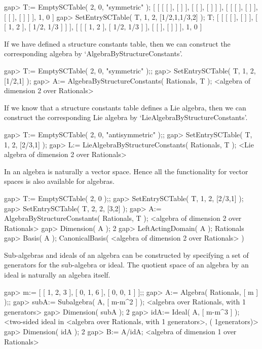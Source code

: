 \beginexample
    gap> T:= EmptySCTable( 2, 0, "symmetric" );
    [ [ [ [  ], [  ] ], [ [  ], [  ] ] ], [ [ [  ], [  ] ], [ [  ], [  ] ] ], 1, 0 ]
    gap> SetEntrySCTable( T, 1, 2, [1/2,1,1/3,2] ); T;
    [ [ [ [  ], [  ] ], [ [ 1, 2 ], [ 1/2, 1/3 ] ] ], 
    [ [ [ 1, 2 ], [ 1/2, 1/3 ] ], [ [  ], [  ] ] ], 1, 0 ]
\endexample

If we have defined a structure constants table, then we can construct
the corresponding algebra by `AlgebraByStructureConstants'.

\beginexample
    gap> T:= EmptySCTable( 2, 0, "symmetric" );;
    gap> SetEntrySCTable( T, 1, 2, [1/2,1] );
    gap> A:= AlgebraByStructureConstants( Rationals, T );
    <algebra of dimension 2 over Rationals>
\endexample

If we know that a structure constants table defines a Lie algebra,
then we can construct the corresponding Lie algebra by
`LieAlgebraByStructureConstants'. 

\beginexample
    gap> T:= EmptySCTable( 2, 0, "antisymmetric" );;
    gap> SetEntrySCTable( T, 1, 2, [2/3,1] );
    gap> L:= LieAlgebraByStructureConstants( Rationals, T );
    <Lie algebra of dimension 2 over Rationals>
\endexample

In {\GAP} an algebra is naturally a vector space. Hence all the functionality
for vector spaces is also available for algebras.

\beginexample
    gap> T:= EmptySCTable( 2, 0 );;                 
    gap> SetEntrySCTable( T, 1, 2, [2/3,1] );
    gap> SetEntrySCTable( T, 2, 2, [3,2] );  
    gap> A:= AlgebraByStructureConstants( Rationals, T );
    <algebra of dimension 2 over Rationals>
    gap> Dimension( A );
    2
    gap> LeftActingDomain( A );
    Rationals
    gap> Basis( A );
    CanonicalBasis( <algebra of dimension 2 over Rationals> )
\endexample

Sub-algebras and ideals of an algebra can be constructed by specifying
a set of generators for the sub-algebra or ideal. The quotient space
of an algebra by an ideal is naturally an algebra itself.

\beginexample
    gap> m:= [ [ 1, 2, 3 ], [ 0, 1, 6 ], [ 0, 0, 1 ] ];;
    gap> A:= Algebra( Rationals, [ m ] );;
    gap> subA:= Subalgebra( A, [ m-m^2 ] );   
    <algebra over Rationals, with 1 generators>
    gap> Dimension( subA );
    2
    gap> idA:= Ideal( A, [ m-m^3 ] );
    <two-sided ideal in <algebra over Rationals, with 1 generators>, (
    1generators)>
    gap> Dimension( idA ); 
    2
    gap> B:= A/idA;
    <algebra of dimension 1 over Rationals>
\endexample

